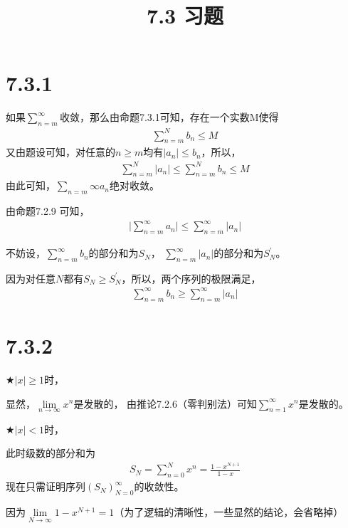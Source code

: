 \documentclass{article}
\theoremstyle{mystyle}
\begin{document}
\title{7.3 习题}
\maketitle

\section*{7.3.1}

如果$\sum \limits_{n=m}^\infty$收敛，那么由命题7.3.1可知，存在一个实数M使得
\begin{align*}
  \sum \limits_{n=m}^N b_n \leq M
\end{align*}
又由题设可知，对任意的$n \geq m$均有$|a_n| \leq b_n$，所以，
\begin{align*}
  \sum \limits_{n=m}^N |a_n|  \leq \sum \limits_{n=m}^N b_n \leq M
\end{align*}
由此可知，$\sum \limits_{n=m}\infty a_n$绝对收敛。


由命题7.2.9 可知，
\begin{align*}
  \big|\sum \limits_{n=m}^\infty a_n\big| \leq \sum \limits_{n=m}^\infty |a_n|
\end{align*}

不妨设，$\sum \limits_{n=m}^\infty b_n$的部分和为$S_N$，
$\sum \limits_{n=m}^\infty |a_n|$的部分和为$S_N^\prime$。

因为对任意$N$都有$S_N \geq S_N^\prime$，所以，两个序列的极限满足，
\begin{align*}
  \sum \limits_{n=m}^\infty b_n \geq \sum \limits_{n=m}^\infty |a_n|
\end{align*}

\section*{7.3.2}

$\bigstar |x| \geq 1$时，

显然，$\lim \limits_{n \rightarrow \infty} x^n$是发散的，
由推论7.2.6（零判别法）可知$\sum \limits_{n=1}^\infty x^n$是发散的。

$\bigstar |x| < 1$时，

此时级数的部分和为
\begin{align*}
  S_N = \sum \limits_{n=0}^N x^n = \frac{1-x^{N+1}}{1-x}
\end{align*}
现在只需证明序列$(S_N)_{N=0}^\infty$的收敛性。

因为$\lim \limits_{N \rightarrow \infty} 1-x^{N+1} = 1$（为了逻辑的清晰性，一些显然的结论，会省略掉）
\end{document}
